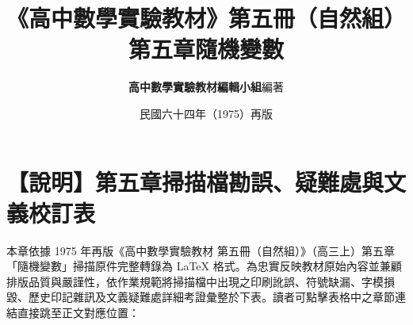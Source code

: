 \documentclass[a4paper,12pt,twoside]{article}
\title{\LARGE\textbf{《高中數學實驗教材》第五冊（自然組）}\\[0.5em] \Large\textbf{第五章\quad 隨機變數}}
\author{\textbf{高中數學實驗教材編輯小組}\quad 編著}
\date{民國六十四年（1975）再版}
\begin{document}
\maketitle
\thispagestyle{firstpage}

\section*{【說明】第五章掃描檔勘誤、疑難處與文義校訂表}
\label{sec:errata_notes_b5_ch5}

本章依據 1975 年再版《高中數學實驗教材 第五冊（自然組）》（高三上）第五章「隨機變數」掃描原件完整轉錄為 \LaTeX{} 格式。為忠實反映教材原始內容並兼顧排版品質與嚴謹性，依作業規範將掃描檔中出現之印刷訛誤、符號缺漏、字模損毀、歷史印記雜訊及文義疑難處詳細考證彙整於下表。讀者可點擊表格中之章節連結直接跳至正文對應位置：
\end{document}
